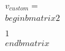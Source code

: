 \documentclass[preview]{standalone}
\begin{document}
\begin{align*}
v_{custom} = \\begin{bmatrix} 2 \\\\ 1 \\end{bmatrix}
\end{align*}
\end{document}
